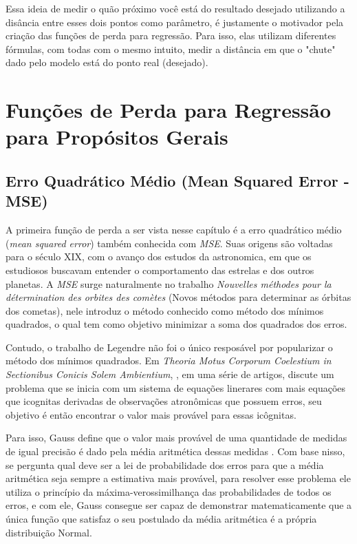 Essa ideia de medir o quão próximo você está do resultado desejado utilizando a disância entre esses dois pontos como parâmetro, é justamente o motivador pela criação das funções de perda para regressão. Para isso, elas utilizam diferentes fórmulas, com todas com o mesmo intuito, medir a distância em que o "chute" dado pelo modelo está do ponto real (desejado).

\section{Funções de Perda para Regressão para Propósitos Gerais}

\subsection{Erro Quadrático Médio (Mean Squared Error - MSE)}

A primeira função de perda a ser vista nesse capítulo é a erro quadrático médio (\textit{mean squared error}) também conhecida com \textit{MSE}. Suas origens são voltadas para o século XIX, com o avanço dos estudos da astronomica, em que os estudiosos buscavam entender o comportamento das estrelas e dos outros planetas. A \textit{MSE} surge naturalmente no trabalho \textit{Nouvelles méthodes pour la détermination des orbites des comètes} (Novos métodos para determinar as órbitas dos cometas), nele \textcite{Legendre1805} introduz o método conhecido como método dos mínimos quadrados, o qual tem como objetivo minimizar a soma dos quadrados dos erros.

Contudo, o trabalho de Legendre não foi o único resposável por popularizar o método dos mínimos quadrados. Em \textit{Theoria Motus Corporum Coelestium in Sectionibus Conicis Solem Ambientium}, \textcite{Gauss1809}, em uma série de artigos, discute um problema que se inicia com um sistema de equações linerares com mais equações que icognitas derivadas de observações atronômicas que possuem erros, seu objetivo é então encontrar o valor mais provável para essas icôgnitas.

Para isso, Gauss define que o valor mais provável de uma quantidade de medidas de igual precisão é dado pela média aritmética dessas medidas \parencite{Gauss1809}. Com base nisso, \textcite{Gauss1809} se pergunta qual deve ser a lei de probabilidade dos erros para que a média aritmética seja sempre a estimativa mais provável, para resolver esse problema ele utiliza o princípio da máxima-verossimilhança das probabilidades de todos os erros, e com ele, Gauss consegue ser capaz de demonstrar matematicamente que a única função que satisfaz o seu postulado da média aritmética é a própria distribuição Normal.

